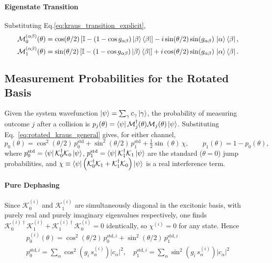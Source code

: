 \documentclass[a4paper,12pt]{article}
\begin{document}
\paragraph{Eigenstate Transition}
Substituting Eq.\ref{eq:kraus_transition_explicit},
\begin{align}
	\mathcal{M}_{0}^{(\alpha\beta)}(\theta) &= \cos(\theta/2)\left[\mathbb{I} - \left(1-\cos g_{\alpha\beta}\right)\Ket{\beta}\Bra{\beta}\right] - i\sin(\theta/2)\sin(g_{\alpha\beta})\,\Ket{\alpha}\Bra{\beta}, \\
	\mathcal{M}_{1}^{(\alpha\beta)}(\theta) &= \sin(\theta/2)\left[\mathbb{I} - \left(1-\cos g_{\alpha\beta}\right)\Ket{\beta}\Bra{\beta}\right] + i\cos(\theta/2)\sin(g_{\alpha\beta})\,\Ket{\alpha}\Bra{\beta}.
\end{align}

\subsection{Measurement Probabilities for the Rotated Basis}

Given the system wavefunction $\Ket{\psi}=\sum_{\gamma}c_{\gamma}\Ket{\gamma}$, the probability of measuring outcome $j$ 
after a collision is $p_{j}(\theta) = \Bra{\psi}\mathcal{M}_{j}^{\dagger}(\theta)\mathcal{M}_{j}(\theta)\Ket{\psi}$. 
Substituting Eq.~\eqref{eq:rotated_kraus_general} gives, for either channel,
\begin{equation}
	p_{0}(\theta) = \cos^{2}(\theta/2)\,p_{0}^{\text{std}} + \sin^{2}(\theta/2)\,p_{1}^{\text{std}} + \tfrac{1}{2}\sin(\theta)\,\chi, 
	\qquad p_{1}(\theta) = 1-p_{0}(\theta),
	\label{eq:rotated_probabilities}
\end{equation}
where $p_{0}^{\text{std}}=\Bra{\psi}\mathcal{K}_{0}^{\dagger}\mathcal{K}_{0}\Ket{\psi}$, $p_{1}^{\text{std}}=\Bra{\psi}\mathcal{K}_{1}^{\dagger}\mathcal{K}_{1}\Ket{\psi}$ 
are the standard ($\theta=0$) jump probabilities, and $\chi \equiv \Bra{\psi}\left(\mathcal{K}_{0}^{\dagger}\mathcal{K}_{1}+\mathcal{K}_{1}^{\dagger}\mathcal{K}_{0}\right)\Ket{\psi}$ 
is a real interference term.

\paragraph{Pure Dephasing} Since $\mathcal{K}_{0}^{(i)}$ and $\mathcal{K}_{1}^{(i)}$ are simultaneously diagonal in the excitonic basis, with purely real and purely imaginary eigenvalues respectively, one finds $\mathcal{K}_{0}^{(i)\dagger}\mathcal{K}_{1}^{(i)}+\mathcal{K}_{1}^{(i)\dagger}\mathcal{K}_{0}^{(i)}=0$ identically, so $\chi^{(i)}=0$ for any state. Hence
\begin{gather}
	p_{0}^{(i)}(\theta) = \cos^{2}(\theta/2)\,p_{0}^{\text{std},i} + \sin^{2}(\theta/2)\,p_{1}^{\text{std},i} \\
	p_{0}^{\text{std},i} = \sum_{\alpha} \cos^{2}\!\left(g_{i}\,s_{\alpha}^{(i)}\right)|c_{\alpha}|^{2}, \quad p_{1}^{\text{std},i} = \sum_{\alpha} \sin^{2}\!\left(g_{i}\,s_{\alpha}^{(i)}\right)|c_{\alpha}|^{2}
\end{gather}
\end{document}
